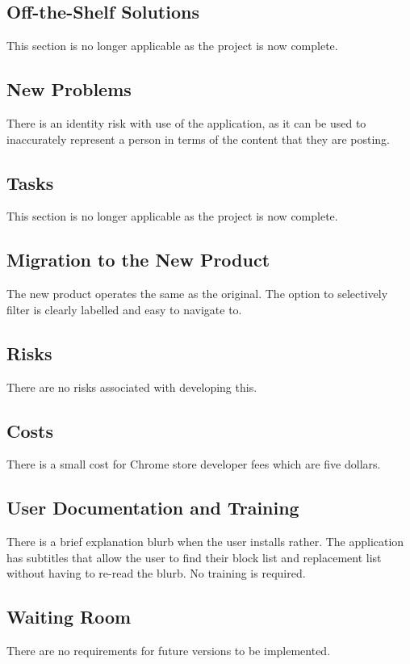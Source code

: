\documentclass[12pt, titlepage]{article}
\begin{document}
\subsection{Off-the-Shelf Solutions}
This section is no longer applicable as the project is now complete.

\subsection{New Problems}
There is an identity risk with use of the application, as it can be used to inaccurately represent a person in terms of the content that they are posting.

\subsection{Tasks}
This section is no longer applicable as the project is now complete.
\subsection{Migration to the New Product}
The new product operates the same as the original. The option to selectively filter is clearly labelled and easy to navigate to.

\subsection{Risks}
There are no risks associated with developing this.

\subsection{Costs}
There is a small cost for Chrome store developer fees which are five dollars.

\subsection{User Documentation and Training}
There is a brief explanation blurb when the user installs rather. The application has subtitles that allow the user to find their block list and replacement list without having to re-read the blurb. No training is required.

\subsection{Waiting Room}
There are no requirements for future versions to be implemented.
\end{document}
